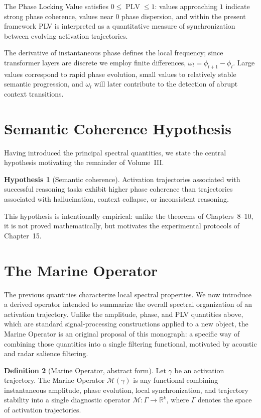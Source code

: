 \documentclass[11pt,twoside,openright]{book}
\numberwithin{equation}{chapter}
\theoremstyle{definition}
\newtheorem{definition}{Definition}[chapter]
\theoremstyle{plain}
\theoremstyle{remark}
\theoremstyle{definition}
\newtheorem{hypothesis}[definition]{Hypothesis}
\begin{document}
The Phase Locking Value satisfies $0\le\operatorname{PLV}\le1$: values
approaching $1$ indicate strong phase coherence, values near $0$ phase
dispersion, and within the present framework PLV is interpreted as a
quantitative measure of synchronization between evolving activation
trajectories.

The derivative of instantaneous phase defines the local frequency; since
transformer layers are discrete we employ finite differences,
$\omega_l=\phi_{l+1}-\phi_l$. Large values correspond to rapid phase
evolution, small values to relatively stable semantic progression, and
$\omega_l$ will later contribute to the detection of abrupt context
transitions.

\section{Semantic Coherence Hypothesis}

Having introduced the principal spectral quantities, we state the central
hypothesis motivating the remainder of Volume~III.

\begin{hypothesis}[Semantic coherence]
Activation trajectories associated with successful reasoning tasks
exhibit higher phase coherence than trajectories associated with
hallucination, context collapse, or inconsistent reasoning.
\end{hypothesis}

This hypothesis is intentionally empirical: unlike the theorems of
Chapters~8--10, it is not proved mathematically, but motivates the
experimental protocols of Chapter~15.

\section{The Marine Operator}

The previous quantities characterize local spectral properties. We now
introduce a derived operator intended to summarize the overall spectral
organization of an activation trajectory. Unlike the amplitude, phase,
and PLV quantities above, which are standard signal-processing
constructions applied to a new object, the Marine Operator is an original
proposal of this monograph: a specific way of combining those quantities
into a single filtering functional, motivated by acoustic and radar
salience filtering.

\begin{definition}[Marine Operator, abstract form]
Let $\gamma$ be an activation trajectory. The Marine Operator
$\mathcal{M}(\gamma)$ is any functional combining instantaneous
amplitude, phase evolution, local synchronization, and trajectory
stability into a single diagnostic operator
$\mathcal{M}:\Gamma\to\mathbb{R}^{k}$, where $\Gamma$ denotes the space of
activation trajectories.
\end{definition}
\end{document}
